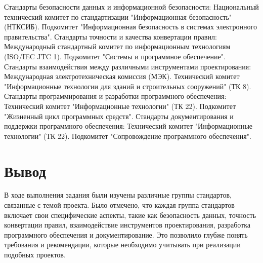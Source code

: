 Стандарты безопасности данных и информационной безопасности:
Национальный технический комитет по стандартизации "Информационная безопасность" (НТКСИБ).
Подкомитет "Информационная безопасность в системах электронного правительства".
Стандарты точности и качества конвертации правил:
Международный стандартный комитет по информационным технологиям (ISO/IEC JTC 1).
Подкомитет "Системы и программное обеспечение".
Стандарты взаимодействия между различными инструментами проектирования:
Международная электротехническая комиссия (МЭК).
Технический комитет "Информационные технологии для зданий и строительных сооружений" (ТК 8).
Стандарты программирования и разработки программного обеспечения:
Технический комитет "Информационные технологии" (ТК 22).
Подкомитет "Жизненный цикл программных средств".
Стандарты документирования и поддержки программного обеспечения:
Технический комитет "Информационные технологии" (ТК 22).
Подкомитет "Сопровождение программного обеспечения".


\clearpage

\section*{\LARGE Вывод}

В ходе выполнения задания были изучены различные группы стандартов,
связанные с темой проекта.
Было отмечено, что каждая группа стандартов включает
свои специфические аспекты,
такие как безопасность данных, точность конвертации правил,
взаимодействие инструментов проектирования,
разработка программного обеспечения и документирование.
Это позволило глубже понять требования и рекомендации,
которые необходимо учитывать при реализации подобных проектов.

